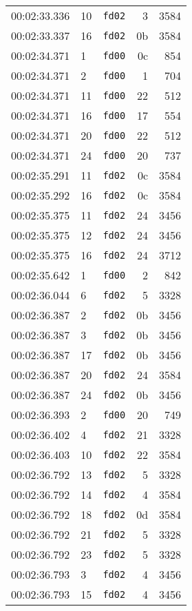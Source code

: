 \documentclass{article}
\begin{document}
\begin{longtable}{lllrr}
00:02:33.336 & 10 & \texttt{fd02} & 3 & 3584 \\
00:02:33.337 & 16 & \texttt{fd02} & 0b & 3584 \\
00:02:34.371 & 1 & \texttt{fd00} & 0c & 854 \\
00:02:34.371 & 2 & \texttt{fd00} & 1 & 704 \\
00:02:34.371 & 11 & \texttt{fd00} & 22 & 512 \\
00:02:34.371 & 16 & \texttt{fd00} & 17 & 554 \\
00:02:34.371 & 20 & \texttt{fd00} & 22 & 512 \\
00:02:34.371 & 24 & \texttt{fd00} & 20 & 737 \\
00:02:35.291 & 11 & \texttt{fd02} & 0c & 3584 \\
00:02:35.292 & 16 & \texttt{fd02} & 0c & 3584 \\
00:02:35.375 & 11 & \texttt{fd02} & 24 & 3456 \\
00:02:35.375 & 12 & \texttt{fd02} & 24 & 3456 \\
00:02:35.375 & 16 & \texttt{fd02} & 24 & 3712 \\
00:02:35.642 & 1 & \texttt{fd00} & 2 & 842 \\
00:02:36.044 & 6 & \texttt{fd02} & 5 & 3328 \\
00:02:36.387 & 2 & \texttt{fd02} & 0b & 3456 \\
00:02:36.387 & 3 & \texttt{fd02} & 0b & 3456 \\
00:02:36.387 & 17 & \texttt{fd02} & 0b & 3456 \\
00:02:36.387 & 20 & \texttt{fd02} & 24 & 3584 \\
00:02:36.387 & 24 & \texttt{fd02} & 0b & 3456 \\
00:02:36.393 & 2 & \texttt{fd00} & 20 & 749 \\
00:02:36.402 & 4 & \texttt{fd02} & 21 & 3328 \\
00:02:36.403 & 10 & \texttt{fd02} & 22 & 3584 \\
00:02:36.792 & 13 & \texttt{fd02} & 5 & 3328 \\
00:02:36.792 & 14 & \texttt{fd02} & 4 & 3584 \\
00:02:36.792 & 18 & \texttt{fd02} & 0d & 3584 \\
00:02:36.792 & 21 & \texttt{fd02} & 5 & 3328 \\
00:02:36.792 & 23 & \texttt{fd02} & 5 & 3328 \\
00:02:36.793 & 3 & \texttt{fd02} & 4 & 3456 \\
00:02:36.793 & 15 & \texttt{fd02} & 4 & 3456 \\

\end{longtable}
\end{document}
